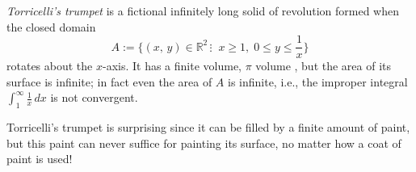 \documentclass[12pt]{article}
\theoremstyle{definition}
\begin{document}

\emph{Torricelli's trumpet} is a fictional infinitely long solid of revolution formed when the closed domain
\[
  A := \{(x,\,y)\in\mathbb{R}^2\,\vdots\;\; x \ge 1,\; 0 \le y \le \frac{1}{x}\}
\]
rotates about the $x$-axis.  It has a finite volume, $\pi$ volume
, but the area of its surface is infinite; in
fact even the area of $A$ is infinite, i.e., the improper integral
$\displaystyle\int_1^\infty\frac{1}{x}\,dx$ is not convergent.

Torricelli's trumpet is surprising since it can be filled by a finite
amount of paint, but this paint can never suffice for painting its
surface, no matter how  a coat of paint is
used!

\end{document}

